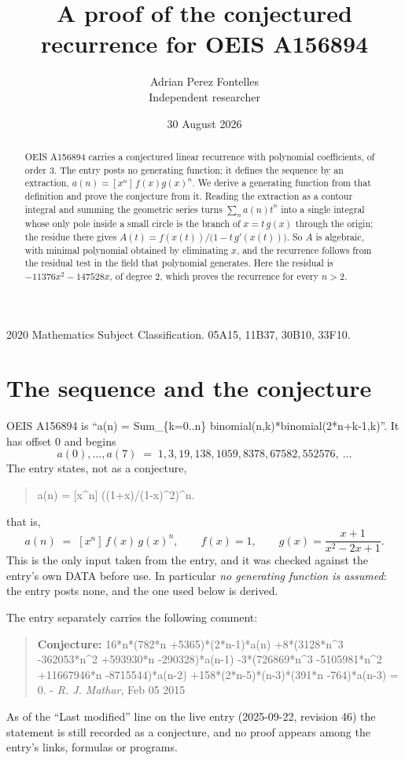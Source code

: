 \documentclass[11pt,a4paper]{article}
\title{A proof of the conjectured recurrence for OEIS A156894}
\author{Adrian Perez Fontelles\\ \small Independent researcher}
\date{30 August 2026}
\theoremstyle{plain}
\theoremstyle{definition}
\begin{document}
\maketitle

\begin{abstract}
OEIS A156894 carries a conjectured linear recurrence with polynomial coefficients, of
order 3. The entry posts no generating function; it defines the sequence by an
extraction, $a(n)=[x^{n}]\,f(x)g(x)^{n}$. We derive a generating function from that
definition and prove the conjecture from it. Reading the extraction as a contour integral
and summing the geometric series turns $\sum_{n}a(n)t^{n}$ into a single integral whose
only pole inside a small circle is the branch of $x=t\,g(x)$ through the origin; the
residue there gives $A(t)=f(x(t))/\bigl(1-t\,g'(x(t))\bigr)$. So $A$ is algebraic, with
minimal polynomial obtained by eliminating $x$, and the recurrence follows from the
residual test in the field that polynomial generates. Here the residual is
$- 11376 x^{2} - 147528 x$, of degree $2$, which proves the recurrence for every $n>2$.
\end{abstract}

\noindent\small 2020 Mathematics Subject Classification. 05A15, 11B37, 30B10, 33F10.\normalsize

\section{The sequence and the conjecture}

OEIS A156894 is ``a(n) = Sum\_\{k=0..n\} binomial(n,k)*binomial(2*n+k-1,k)''. It has offset $0$ and begins
\[
a(0),\dots,a(7)\;=\;1, 3, 19, 138, 1059, 8378, 67582, 552576,\ \dots
\]
The entry states, not as a conjecture,
\begin{quote}\small
a(n) = [x\^{}n] ((1+x)/(1-x)\^{}2)\^{}n.
\end{quote}
that is,
\begin{equation}\label{eq:def}
a(n)\;=\;[x^{n}]\,f(x)\,g(x)^{n},
\qquad f(x)=1,\qquad g(x)=\frac{x + 1}{x^{2} - 2 x + 1} .
\end{equation}
This is the only input taken from the entry, and it was checked against the entry's own
DATA before use. In particular \emph{no generating function is assumed}: the entry posts
none, and the one used below is derived.

The entry separately carries the following comment:
\begin{quote}\small
\textbf{Conjecture:} 16*n*(782*n +5365)*(2*n-1)*a(n) +8*(3128*n\^{}3 -362053*n\^{}2 +593930*n -290328)*a(n-1) -3*(726869*n\^{}3 -5105981*n\^{}2 +11667946*n -8715544)*a(n-2) +158*(2*n-5)*(n-3)*(391*n -764)*a(n-3) = 0. - \emph{R. J. Mathar}, Feb 05 2015
\end{quote}
As of the ``Last modified'' line on the live entry (2025-09-22, revision 46) the
statement is still recorded as a conjecture, and no proof appears among the entry's links,
formulas or programs.
\end{document}
